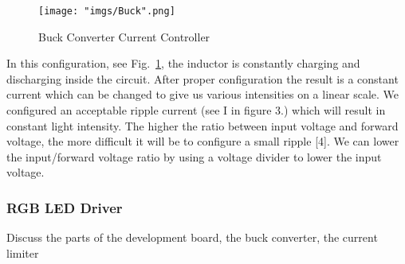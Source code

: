 \documentclass[12pt,a4paper]{report}
\begin{document}
\begin{figure}[H]
	\centering
	\texttt{[image: "imgs/Buck".png]}\par			
	\vspace{0.1cm}
	\caption{Buck Converter Current Controller}
	\label{fig:Buck}
\end{figure}

In this configuration, see Fig.~\ref{fig:Buck}, the inductor is constantly charging and discharging inside the circuit. After proper configuration the result is a constant current which can be changed to give us various intensities on a linear scale. We configured an acceptable ripple current (see I in figure 3.) which will result in constant light intensity.  The higher the ratio between input voltage and forward voltage, the more difficult it will be to configure a small ripple [4]. We can lower the input/forward voltage ratio by using a voltage divider to lower the input voltage. 

\subsubsection{RGB LED Driver}
Discuss the parts of the development board, the buck converter, the current limiter
\end{document}
